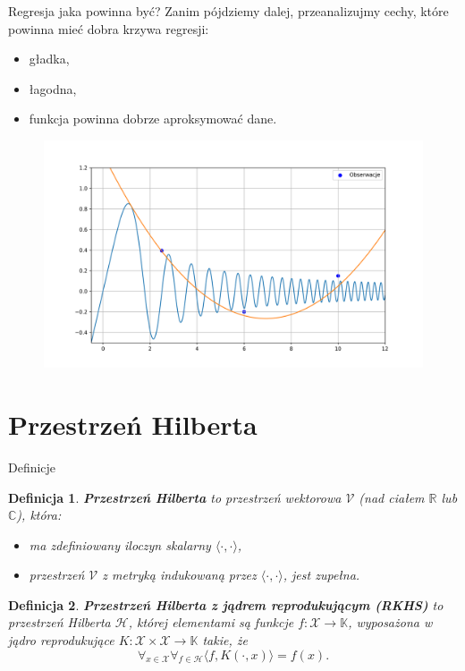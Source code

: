 \documentclass{beamer}
\newtheorem{definicja}{Definicja}
\newcommand{\Hilbert}{\ensuremath{\mathcal{H}}}
\newcommand{\bb}[1]{\ensuremath{\mathbb{#1}}}
\begin{document}
\begin{frame}{Regresja \textendash{} jaka powinna być?}
  Zanim pójdziemy dalej, przeanalizujmy cechy, które powinna mieć dobra krzywa regresji:
  \begin{itemize}
    \item<1-> gładka,
    \item<2-> łagodna,
    \item<3-> funkcja powinna dobrze aproksymować dane.
  \end{itemize}
\end{frame}
\begin{frame}
  \begin{figure}
    \centering
    \includegraphics[width=1\textwidth]{wykres9.png}
  \end{figure}
\end{frame}

\section{Przestrzeń Hilberta}
\begin{frame}[allowframebreaks]{Definicje}
\begin{definicja}
  \textbf{Przestrzeń Hilberta} to przestrzeń wektorowa $\mathcal{V}$ (nad ciałem $\bb{R}$ lub $\bb{C}$), która:
  \begin{itemize}
    \item ma zdefiniowany iloczyn skalarny $\langle \cdot, \cdot \rangle$,
    \item przestrzeń $\mathcal{V}$ z metryką indukowaną przez $\langle \cdot, \cdot \rangle$, jest zupełna.
  \end{itemize}
\end{definicja}
\begin{definicja}
  \textbf{Przestrzeń Hilberta z jądrem reprodukującym (RKHS)} to przestrzeń Hilberta $\Hilbert$, której elementami są funkcje $f: \mathcal{X} \rightarrow \bb{K}$, wyposażona w jądro reprodukujące $K: \mathcal{X} \times \mathcal{X} \rightarrow \bb{K}$ takie, że
  \[
    \forall_{x \in \mathcal{X}} \forall_{f \in \Hilbert} \langle f, K(\cdot, x) \rangle = f(x).
  \]
\end{definicja}
\end{frame}
\end{document}

